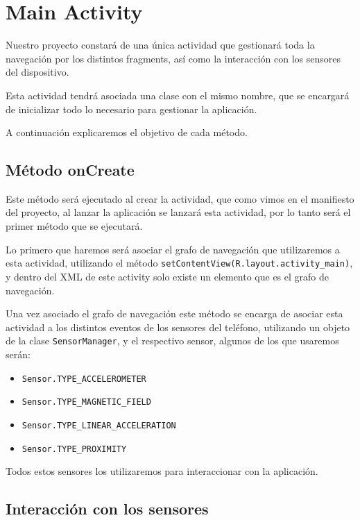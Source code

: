 \section{Main Activity}

Nuestro proyecto constará de una única actividad\cite{activityAndroid} que gestionará toda la navegación por los distintos fragments, así como la interacción con los sensores del dispositivo.

Esta actividad tendrá asociada una clase con el mismo nombre, que se encargará de inicializar todo lo necesario para gestionar la aplicación.

A continuación explicaremos el objetivo de cada método.

\subsection{Método onCreate}

Este método será ejecutado al crear la actividad, que como vimos en el manifiesto del proyecto, al lanzar la aplicación se lanzará esta actividad, por lo tanto será el primer método que se ejecutará.



Lo primero que haremos será asociar el grafo de navegación que utilizaremos a esta actividad, utilizando el método \texttt{setContentView(R.layout.activity\_main)}, y dentro del XML de este activity solo existe un elemento que es el grafo de navegación.

Una vez asociado el grafo de navegación este método se encarga de asociar esta actividad a los distintos eventos de los sensores del teléfono\cite{tiposSensoresAndroid}, utilizando un objeto de la clase \texttt{SensorManager}\cite{sensorAndroid}, y el respectivo sensor, algunos de los que usaremos serán:

\begin{itemize}
	\item \texttt{Sensor.TYPE\_ACCELEROMETER}
	\item \texttt{Sensor.TYPE\_MAGNETIC\_FIELD}
	\item \texttt{Sensor.TYPE\_LINEAR\_ACCELERATION}
	\item \texttt{Sensor.TYPE\_PROXIMITY}

\end{itemize}

Todos estos sensores los utilizaremos para interaccionar con la aplicación.


\subsection{Interacción con los sensores}

